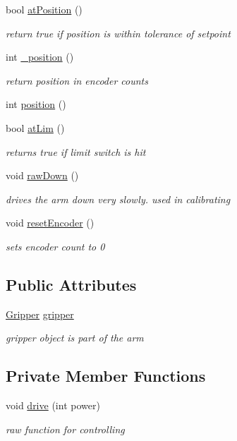 \begin{DoxyCompactItemize}
bool \hyperlink{classArm_ae3c0195535b15f56f9027aea0ae5ec76}{at\-Position} ()
\begin{DoxyCompactList}\small\item\em return true if position is within tolerance of setpoint \end{DoxyCompactList}\item 
int \hyperlink{classArm_a45b8faa17da013c35ada035a0a88659f}{\-\_\-position} ()
\begin{DoxyCompactList}\small\item\em return position in encoder counts \end{DoxyCompactList}\item 
int \hyperlink{classArm_ab49756ee4bfdc5f573a78f29678bf1d8}{position} ()
\item 
bool \hyperlink{classArm_a234397ff44a8ac5fda920d92b9b33237}{at\-Lim} ()
\begin{DoxyCompactList}\small\item\em returns true if limit switch is hit \end{DoxyCompactList}\item 
void \hyperlink{classArm_a90df7bcd3c225f6fc05ef2f77c773d2e}{raw\-Down} ()
\begin{DoxyCompactList}\small\item\em drives the arm down very slowly. used in calibrating \end{DoxyCompactList}\item 
void \hyperlink{classArm_afb44126b438f8dc00b0bf0720c84a737}{reset\-Encoder} ()
\begin{DoxyCompactList}\small\item\em sets encoder count to 0 \end{DoxyCompactList}\end{DoxyCompactItemize}
\subsection*{Public Attributes}
\begin{DoxyCompactItemize}
\item 
\hyperlink{classGripper}{Gripper} \hyperlink{classArm_a1f237e56fc1e76c2b63f1f59d847945d}{gripper}
\begin{DoxyCompactList}\small\item\em gripper object is part of the arm \end{DoxyCompactList}\end{DoxyCompactItemize}
\subsection*{Private Member Functions}
\begin{DoxyCompactItemize}
\item 
void \hyperlink{classArm_aef69c0a871a4443e3e1109c5a742e4b8}{drive} (int power)
\begin{DoxyCompactList}\small\item\em raw function for controlling \end{DoxyCompactList}\end{DoxyCompactItemize}
